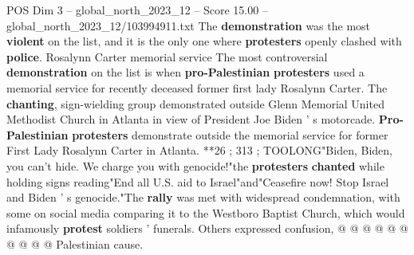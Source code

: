 \begin{textsample}{POS Dim 3 – global\_north\_2023\_12 – Score 15.00 – global\_north\_2023\_12/103994911.txt}
The \textbf{demonstration} was the most \textbf{violent} on the list, and it is the only one where \textbf{protesters} openly clashed with \textbf{police}.
Rosalynn Carter memorial service The most controversial \textbf{demonstration} on the list is when \textbf{pro-Palestinian} \textbf{protesters} used a memorial service for recently deceased former first lady Rosalynn Carter.
The \textbf{chanting}, sign-wielding group demonstrated outside Glenn Memorial United Methodist Church in Atlanta in view of President Joe Biden ' s motorcade. \textbf{Pro-Palestinian} \textbf{protesters} demonstrate outside the memorial service for former First Lady Rosalynn Carter in Atlanta. **26 ; 313 ; TOOLONG"Biden, Biden, you can't hide.
We charge you with genocide!"the \textbf{protesters} \textbf{chanted} while holding signs reading"End all U.S. aid to Israel"and"Ceasefire now!
Stop Israel and Biden ' s genocide."The \textbf{rally} was met with widespread condemnation, with some on social media comparing it to the Westboro Baptist Church, which would infamously \textbf{protest} soldiers ' funerals.
Others expressed confusion, @ @ @ @ @ @ @ @ @ @ Palestinian cause.

\end{textsample}

